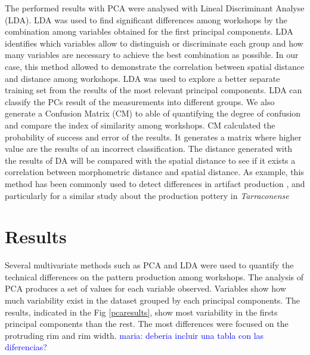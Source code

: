 \documentclass[review]{elsarticle}
\newcommand{\memo}[2]{\textcolor{#1}{#2}}
\newcommand{\maria}[1]{\memo{blue}{maria: #1\\}}
\begin{document}
The performed results with PCA were analysed with Lineal Discriminant Analyse (LDA). LDA was used to find significant differences among workshops by the combination among variables obtained for the first principal components. LDA identifies which variables allow to distinguish or discriminate each group and how many variables are necessary to achieve the best combination as possible. In our case, this method allowed to demonstrate the correlation between spatial distance and distance among workshops. LDA was used to explore a better separate training set from the results of the most relevant principal components. LDA can classify the PCs result of the measurements into different groups.  We also generate a Confusion Matrix (CM) to able of quantifying the degree of confusion and compare the index of similarity among workshops.  CM calculated the probability of success and error of the results. It generates a matrix where higher value are the results of an incorrect classification. The distance generated with the results of DA will be compared with the spatial distance to see if it exists a correlation between morphometric distance and spatial distance. As example, this method has been commonly used to detect differences in  artifact production \citep{charlton_investigating_2012, thorpe_distribution_1984}, and particularly for a similar study about the production pottery in \emph{Tarraconense} \citep{i_martin_alisis_1998}



\section{Results}

Several multivariate methods such as PCA and LDA were used to quantify the technical differences on the pattern production among workshops. The analysis of PCA produces a set of values for each variable observed. Variables show how much variability exist in the dataset grouped by each principal components. The results, indicated in the Fig \ref{pcaresults}, show most variability in the firsts principal components than the rest.
The most differences were focused on the protruding rim and rim width.  
\maria{deberia incluir una tabla con las diferencias?}
\end{document}
